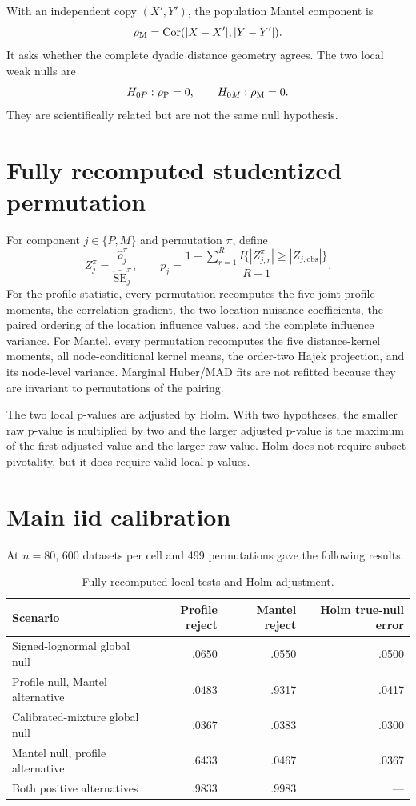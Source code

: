 With an independent copy $(X',Y')$, the population Mantel component is
\begin{equation}
\rho_{\mathrm{M}}=\operatorname{Cor}(|X-X'|,|Y-Y'|).
\end{equation}
It asks whether the complete dyadic distance geometry agrees. The two local
weak nulls are
\begin{equation}
H_{0P}:\rho_{\mathrm{P}}=0, \qquad H_{0M}:\rho_{\mathrm{M}}=0.
\end{equation}
They are scientifically related but are not the same null hypothesis.

\section{Fully recomputed studentized permutation}

For component $j\in\{P,M\}$ and permutation $\pi$, define
\begin{equation}
Z_j^\pi=\frac{\widehat\rho_j^\pi}{\widehat{\operatorname{SE}}_j^\pi},
\qquad
p_j=\frac{1+\sum_{r=1}^{R}
I\{|Z_{j,r}^\pi|\geq |Z_{j,\mathrm{obs}}|\}}{R+1}.
\end{equation}
For the profile statistic, every permutation recomputes the five joint
profile moments, the correlation gradient, the two location-nuisance
coefficients, the paired ordering of the location influence values, and the
complete influence variance. For Mantel, every permutation recomputes the
five distance-kernel moments, all node-conditional kernel means, the
order-two Hajek projection, and its node-level variance. Marginal Huber/MAD
fits are not refitted because they are invariant to permutations of the
pairing.

The two local p-values are adjusted by Holm. With two hypotheses, the smaller
raw p-value is multiplied by two and the larger adjusted p-value is the
maximum of the first adjusted value and the larger raw value. Holm does not
require subset pivotality, but it does require valid local p-values.

\section{Main iid calibration}

At $n=80$, 600 datasets per cell and 499 permutations gave the following
results.

\begin{table}[ht]
\centering
\caption{Fully recomputed local tests and Holm adjustment.}
\small
\begin{tabular}{lrrr}
\hline
Scenario & Profile reject & Mantel reject & Holm true-null error\\
\hline
Signed-lognormal global null & .0650 & .0550 & .0500\\
Profile null, Mantel alternative & .0483 & .9317 & .0417\\
Calibrated-mixture global null & .0367 & .0383 & .0300\\
Mantel null, profile alternative & .6433 & .0467 & .0367\\
Both positive alternatives & .9833 & .9983 & ---\\
\hline
\end{tabular}
\end{table}

